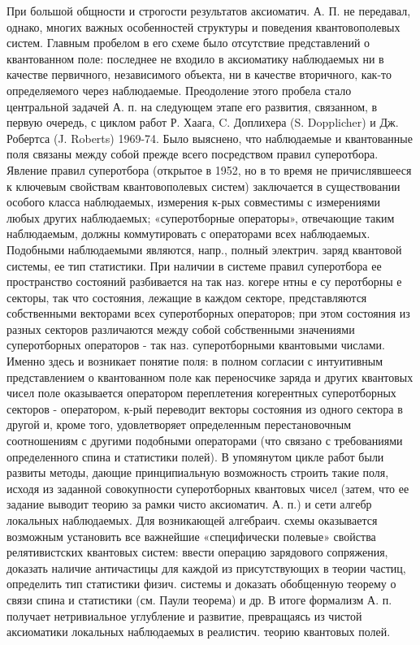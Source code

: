 \documentclass[10pt]{article}
\begin{document}
При большой общности и строгости результатов аксиоматич. А. П. не передавал, однако, многих важных особенностей структуры и поведения квантовополевых систем. Главным пробелом в его схеме было отсутствие представлений о квантованном поле: последнее не входило в аксиоматику наблюдаемых ни в качестве первичного, независимого объекта, ни в качестве вторичного, как-то определяемого через наблюдаемые. Преодоление этого пробела стало центральной задачей А. п. на следующем этапе его развития, связанном, в первую очередь, с циклом работ Р. Хаага, C. Доплихера (S. Dopplicher) и Дж. Робертса (J. Roberts) 1969-74. Было выяснено, что наблюдаемые и квантованные поля связаны между собой прежде всего посредством правил суперотбора. Явление правил суперотбора (открытое в 1952, но в то время не причислявшееся к ключевым свойствам квантовополевых систем) заключается в существовании особого класса наблюдаемых, измерения к-рых совместимы с измерениями любых других наблюдаемых; «суперотборные операторы», отвечающие таким наблюдаемым, должны коммутировать с операторами всех наблюдаемых. Подобными наблюдаемыми являются, напр., полный электрич. заряд квантовой системы, ее тип статистики. При наличии в системе правил суперотбора ее пространство состояний разбивается на так наз. когере нтны е су перотборны е секторы, так что состояния, лежащие в каждом секторе, представляются собственными векторами всех суперотборных операторов; при этом состояния из разных секторов различаются между собой собственными значениями суперотборных операторов - так наз. суперотборными квантовыми числами. Именно здесь и возникает понятие поля: в полном согласии с интуитивным представлением о квантованном поле как переносчике заряда и других квантовых чисел поле оказывается оператором переплетения когерентных суперотборных секторов - оператором, к-рый переводит векторы состояния из одного сектора в другой и, кроме того, удовлетворяет определенным перестановочным соотношениям с другими подобными операторами (что связано с требованиями определенного спина и статистики полей). В упомянутом цикле работ были развиты методы, дающие принципиальную возможность строить такие поля, исходя из заданной совокупности суперотборных квантовых чисел (затем, что ее задание выводит теорию за рамки чисто аксиоматич. А. п.) и сети алгебр локальных наблюдаемых. Для возникающей алгебраич. схемы оказывается возможным установить все важнейшие «специфически полевые» свойства релятивистских квантовых систем: ввести операцию зарядового сопряжения, доказать наличие античастицы для каждой из присутствующих в теории частиц, определить тип статистики физич. системы и доказать обобщенную теорему о связи спина и статистики (см. Паули теорема) и др. В итоге формализм А. п. получает нетривиальное углубление и развитие, превращаясь из чистой аксиоматики локальных наблюдаемых в реалистич. теорию квантовых полей.
\end{document}
